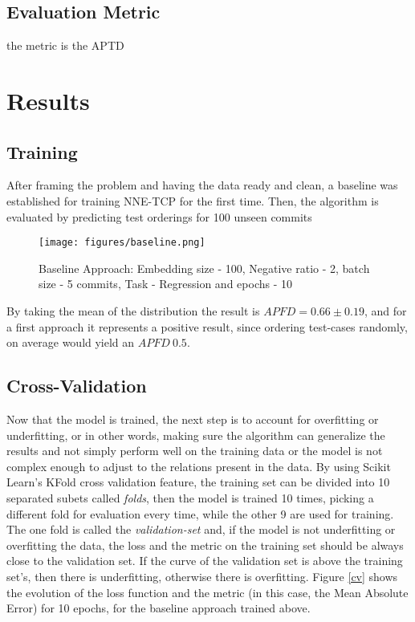 \subsection{Evaluation Metric}

the metric is the APTD

\section{Results}

\subsection{Training}

After framing the problem and having the data ready and clean, a baseline was established for training NNE-TCP for the first time. Then, the algorithm is evaluated by predicting test orderings for 100 unseen commits

\begin{figure}[h]
	\centering
	\texttt{[image: figures/baseline.png]}
	\caption{Baseline Approach: Embedding size - 100, Negative ratio - 2, batch size - 5 commits, Task - Regression and epochs - 10}
	\label{surf}
\end{figure}

By taking the mean of the distribution the result is $ APFD = 0.66 \pm 0.19$, and for a first approach it represents a positive result, since ordering test-cases randomly, on average would yield an $APFD ~0.5$. 

\subsection{Cross-Validation}

Now that the model is trained, the next step is to account for overfitting or underfitting, or in other words, making sure the algorithm can generalize the results and not simply perform well on the training data or the model is not complex enough to adjust to the relations present in the data. 
By using Scikit Learn's KFold cross validation feature, the training set can be divided into 10 separated subets called \textit{folds}, then the model is trained 10 times, picking a different fold for evaluation every time, while the other 9 are used for training. The one fold is called the \textit{validation-set} and, if the model is not underfitting or overfitting the data, the loss and the metric on the training set should be always close to the validation set. If the curve of the validation set is above the training set's, then there is underfitting, otherwise there is overfitting. Figure \ref{cv} shows the evolution of the loss function and the metric (in this case, the Mean Absolute Error) for 10 epochs, for the baseline approach trained above.

